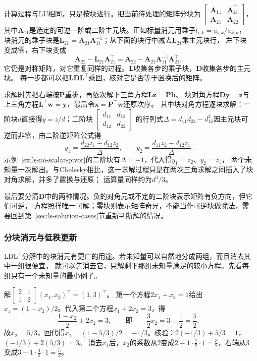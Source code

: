计算过程与LU相同，只是按块进行。把当前待处理的矩阵分块为
$\left[\begin{smallmatrix}\bm A_{11}&\bm A_{21}^\top\\\bm A_{21}&\bm A_{22}\end{smallmatrix}\right]$，
其中$\bm A_{11}$是选定的可逆一阶或二阶主元块。正如标量消元用乘子$l_{i,k}=a_{i,k}/a_{k,k}$，
块消元的乘子块是$\bm L_{21}=\bm A_{21}\bm A_{11}^{-1}$；从下面的块行中减去$\bm L_{21}$乘主元块行，
左下块变成零，右下块变成
\[
 \bm A_{22}-\bm L_{21}\bm A_{21}^\top=\bm A_{22}-\bm A_{21}\bm A_{11}^{-1}\bm A_{21}^\top ,
\]
它仍是对称矩阵，对它重复同样的过程。$\bm L$收集各步的乘子块，$\bm D$收集各步的主元块。
每一步都可以把$\bm L\bm D\bm L^\top$乘回，核对它是否等于置换后的矩阵。

求解时先把右端按$\bm P$重排，再依次解下三角方程$\bm L\bm z=\bm P\bm b$、
块对角方程$\bm D\bm y=\bm z$与上三角方程$\bm L^\top\bm w=\bm y$，最后令$\bm x=\bm P^\top\bm w$还原次序。
其中块对角方程逐块求解：一阶块$d$直接得$y=z/d$；二阶块
$\left[\begin{smallmatrix}d_{11}&d_{12}\\d_{12}&d_{22}\end{smallmatrix}\right]$
的行列式$\Delta=d_{11}d_{22}-d_{12}^2$因主元块可逆而非零，由二阶逆矩阵公式得
\begin{equation}
 y_1=\frac{d_{22}z_1-d_{12}z_2}{\Delta},\qquad
 y_2=\frac{d_{11}z_2-d_{12}z_1}{\Delta}.
\end{equation}
示例~\ref{ex:ls-no-scalar-pivot}的二阶块有$\Delta=-1$，代入得$y_1=z_2$、$y_2=z_1$，
两个未知量一次解出。与Cholesky相比，这一求解过程只是在两次三角求解之间插入了块对角求解，并多了置换与还原；
运算量同样约为$d^3/3$。

最后要分清$\bm D$中的两种情况。负的对角元或不定的二阶块表示矩阵有负方向，但它们可逆，
方程照样唯一可解；零块则表示矩阵奇异，不能当作可逆块做除法，需要回到第~\ref{sec:ls-solution-cases}节重新判断解的情况。

\subsubsection{分块消元与低秩更新}
\label{sec:matrix-analysis-blocks-updates}

LDL$^{\top}$分解中的块消元有更广的用途。若未知量可以自然地分成两组，而且消去其中一组很便宜，
就可以先消去它，只解剩下那组未知量满足的较小方程。先看每组只有一个未知量的最小例子。

\begin{example}[二阶方程的分块消元]
\label{ex:ls-block-elimination-two-by-two}
解$\left[\begin{smallmatrix}2&1\\1&2\end{smallmatrix}\right](x_1,x_2)^\top=(1,3)^\top$。
第一个方程$2x_1+x_2=1$给出$x_1=(1-x_2)/2$。代入第二个方程$x_1+2x_2=3$，得
\[
 \frac{1-x_2}{2}+2x_2=3,\qquad\text{即}\qquad \frac32x_2=3-\frac12=\frac52,
\]
故$x_2=5/3$，回代得$x_1=(1-5/3)/2=-1/3$。核验：$2(-1/3)+5/3=1$，$(-1/3)+2(5/3)=3$。
消去$x_1$后，$x_2$的系数从$2$变成$2-1\cdot\tfrac12\cdot1=\tfrac32$，右端从$3$变成$3-1\cdot\tfrac12\cdot1=\tfrac52$。
\end{example}

